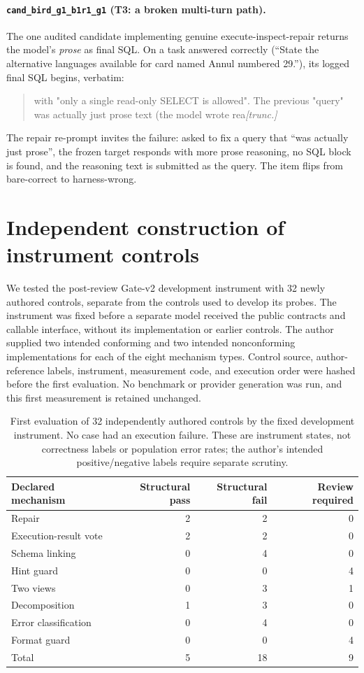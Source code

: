 \paragraph{\texttt{cand\_bird\_g1\_b1r1\_g1} (T3: a broken multi-turn
path).} The one audited candidate implementing genuine execute-inspect-repair
returns the model's \emph{prose} as final SQL. On a task \bare{} answered
correctly (``State the alternative languages available for card named Annul
numbered 29.''), its logged final SQL begins, verbatim:
\begin{quote}\small\ttfamily
with "only a single read-only SELECT is allowed". The previous "query" was
actually just prose text (the model wrote rea\emph{[trunc.]}
\end{quote}
The repair re-prompt invites the failure: asked to fix a query that ``was
actually just prose'', the frozen target responds with more prose reasoning,
no SQL block is found, and the reasoning text is submitted as the query. The
item flips from bare-correct to harness-wrong.

\section{Independent construction of instrument controls}\label{app:gatecontrols}
We tested the post-review Gate-v2 development instrument with 32 newly
authored controls, separate from the controls used to develop its probes.
The instrument was fixed before a separate model received the public
contracts and callable interface, without its implementation or earlier
controls. The author supplied two intended conforming and two intended
nonconforming implementations for each of the eight mechanism types.
Control source, author-reference labels, instrument, measurement code,
and execution order were hashed before the first evaluation. No benchmark
or provider generation was run, and this first measurement is retained unchanged.

\begin{table}[h]
\centering\small
\begin{tabular}{lrrr}\toprule
Declared mechanism & Structural pass & Structural fail & Review required \\\midrule
Repair & 2 & 2 & 0 \\
Execution-result vote & 2 & 2 & 0 \\
Schema linking & 0 & 4 & 0 \\
Hint guard & 0 & 0 & 4 \\
Two views & 0 & 3 & 1 \\
Decomposition & 1 & 3 & 0 \\
Error classification & 0 & 4 & 0 \\
Format guard & 0 & 0 & 4 \\\midrule
Total & 5 & 18 & 9 \\\bottomrule
\end{tabular}
\caption{First evaluation of 32 independently authored controls by the
fixed development instrument. No case had an execution failure. These
are instrument states, not correctness labels or population error rates;
the author's intended positive/negative labels require separate scrutiny.}
\label{tab:gatecontrols}
\end{table}

